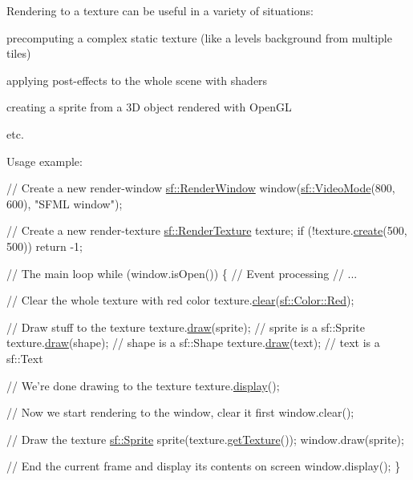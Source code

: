 Rendering to a texture can be useful in a variety of situations\+: \begin{DoxyItemize}
\item precomputing a complex static texture (like a level\textquotesingle{}s background from multiple tiles) \item applying post-\/effects to the whole scene with shaders \item creating a sprite from a 3D object rendered with Open\+GL \item etc.\end{DoxyItemize}
Usage example\+:


\begin{DoxyCode}
\textcolor{comment}{// Create a new render-window}
\hyperlink{classsf_1_1RenderWindow}{sf::RenderWindow} window(\hyperlink{classsf_1_1VideoMode}{sf::VideoMode}(800, 600), \textcolor{stringliteral}{"SFML window"});

\textcolor{comment}{// Create a new render-texture}
\hyperlink{classsf_1_1RenderTexture}{sf::RenderTexture} texture;
\textcolor{keywordflow}{if} (!texture.\hyperlink{classsf_1_1RenderTexture_aefbb76eb3b87e368ab974b2660931ccb}{create}(500, 500))
    \textcolor{keywordflow}{return} -1;

\textcolor{comment}{// The main loop}
\textcolor{keywordflow}{while} (window.isOpen())
\{
   \textcolor{comment}{// Event processing}
   \textcolor{comment}{// ...}

   \textcolor{comment}{// Clear the whole texture with red color}
   texture.\hyperlink{classsf_1_1RenderTarget_a6bb6f0ba348f2b1e2f46114aeaf60f26}{clear}(\hyperlink{classsf_1_1Color_a127dbf55db9c07d0fa8f4bfcbb97594a}{sf::Color::Red});

   \textcolor{comment}{// Draw stuff to the texture}
   texture.\hyperlink{classsf_1_1RenderTarget_a12417a3bcc245c41d957b29583556f39}{draw}(sprite);  \textcolor{comment}{// sprite is a sf::Sprite}
   texture.\hyperlink{classsf_1_1RenderTarget_a12417a3bcc245c41d957b29583556f39}{draw}(shape);   \textcolor{comment}{// shape is a sf::Shape}
   texture.\hyperlink{classsf_1_1RenderTarget_a12417a3bcc245c41d957b29583556f39}{draw}(text);    \textcolor{comment}{// text is a sf::Text}

   \textcolor{comment}{// We're done drawing to the texture}
   texture.\hyperlink{classsf_1_1RenderTexture_af92886d5faef3916caff9fa9ab32c555}{display}();

   \textcolor{comment}{// Now we start rendering to the window, clear it first}
   window.clear();

   \textcolor{comment}{// Draw the texture}
   \hyperlink{classsf_1_1Sprite}{sf::Sprite} sprite(texture.\hyperlink{classsf_1_1RenderTexture_a07ecea85f05932fa02a8279416721bc9}{getTexture}());
   window.draw(sprite);

   \textcolor{comment}{// End the current frame and display its contents on screen}
   window.display();
\}
\end{DoxyCode}


